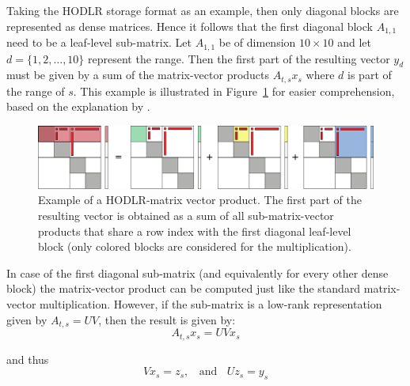\noindent Taking the HODLR storage format as an example, then only diagonal blocks are represented as dense matrices. Hence it follows that the first diagonal block $A_{1,1}$ need to be a leaf-level sub-matrix. Let $A_{1,1}$ be of dimension $10 \times 10$ and let $d = \{1,2,\dots, 10\}$ represent the range. Then the first part of the resulting vector $y_d$ must be given by a sum of the matrix-vector products $A_{t,s}x_s$ where $d$ is part of the range of $s$. This example is illustrated in Figure~\hyperref[fig:matvec]{\ref{fig:matvec}} for easier comprehension, based on the explanation by \cite{ooi_effect_2020}.

\begin{figure}[h]
    \centering
    \includegraphics[width=\linewidth]{chapters/4_hierarchical_matrices/figures/matvec.pdf}
    \caption[Hierarchical Matrix-Vector Product]{Example of a HODLR-matrix vector product. The first part of the resulting vector is obtained as a sum of all sub-matrix-vector products that share a row index with the first diagonal leaf-level block (only colored blocks are considered for the multiplication).}
    \label{fig:matvec}
\end{figure}

In case of the first diagonal sub-matrix (and equivalently for every other dense block) the matrix-vector product can be computed just like the standard matrix-vector multiplication. However, if the sub-matrix is a low-rank representation given by $A_{t,s} = UV$, then the result is given by:
\begin{equation}
    A_{t,s}x_s = UVx_s
\end{equation}

\noindent and thus
\begin{equation}
        Vx_s = z_s, \;\; \text{ and }\;\; Uz_s = y_s 
\end{equation}

